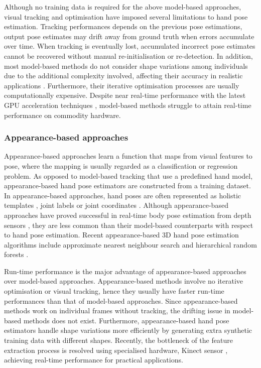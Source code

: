 Although no training data is required for the above model-based approaches, visual tracking and optimisation have imposed several limitations to hand pose estimation. 
Tracking performances depends on the previous pose estimations, output pose estimates may drift away from ground truth when errors accumulate over time. 
When tracking is eventually lost, accumulated incorrect pose estimates cannot be recovered without manual re-initialisation or re-detection. 
In addition, most model-based methods do not consider shape variations among individuals due to the additional complexity involved, affecting their accuracy in realistic applications \cite{Erol2007}.   
Furthermore, their iterative optimisation processes are usually computationally expensive. Despite near real-time performance with the latest GPU acceleration techniques \cite{Oikonomidis2011}, model-based methods struggle to attain real-time performance on commodity hardware. 

\subsubsection{Appearance-based approaches} 
Appearance-based approaches learn a function that maps from visual features to pose, where the mapping is usually regarded as a classification or regression problem. As opposed to model-based tracking that use a predefined hand model, appearance-based hand pose estimators are constructed from a training dataset.   
In appearance-based approaches, hand poses are often represented as holistic templates \cite{Wang2009}, joint labels \cite{Shotton2011} or joint coordinates \cite{Girshick2011}.
Although appearance-based approaches have proved successful in real-time body pose estimation from depth sensors \cite{Shotton2011, Girshick2011, Baak2011, Sun2012}, they are less common than their model-based counterparts with respect to hand pose estimation.  
Recent appearance-based 3D hand pose estimation algorithms include approximate nearest neighbour search \cite{Romero2009, Wang2009} and hierarchical random forests \cite{Keskin2012}.  

Run-time performance is the major advantage of appearance-based approaches over model-based approaches. Appearance-based methods involve no iterative optimisation or visual tracking, hence they usually have faster run-time performances than that of model-based approaches. Since appearance-based methods work on individual frames without tracking, the drifting issue in model-based methods does not exist.
Furthermore, appearance-based hand pose estimators handle shape variations more efficiently by generating extra synthetic training data with different shapes. Recently, the bottleneck of the feature extraction process is resolved using specialised hardware, \eg Kinect sensor \cite{Shotton2011}, achieving real-time performance for practical applications. 

